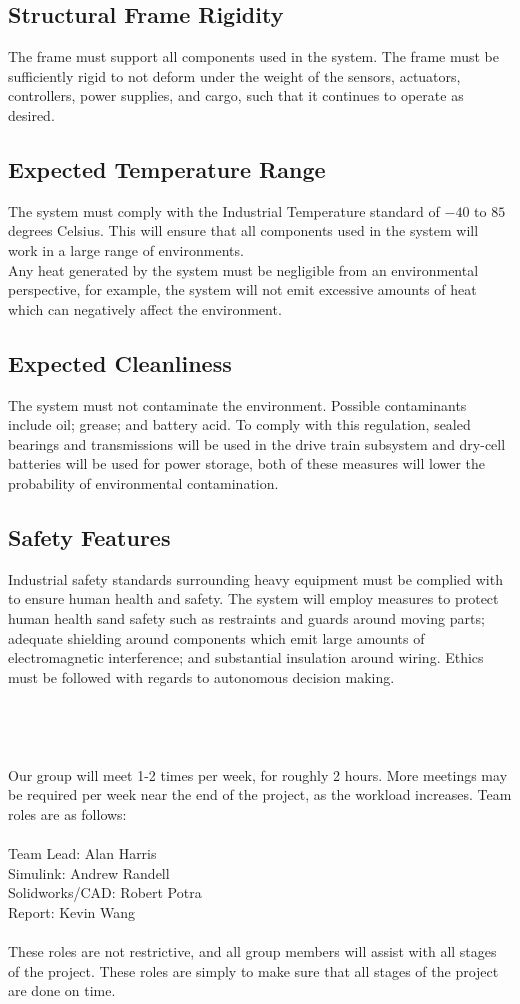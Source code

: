 \documentclass[12pt]{article}
\begin{document}
\subsection{Structural Frame Rigidity}
The frame must support all components used in the system. The frame must be sufficiently rigid to not deform under the weight of the sensors, actuators, controllers, power supplies, and cargo, such that it continues to operate as desired.
\subsection{Expected Temperature Range}
The system must comply with the Industrial Temperature standard of $-40$ to $85$ degrees Celsius. This will ensure that all components used in the system will work in a large range of environments. \\

Any heat generated by the system must be negligible from an environmental perspective, for example, the system will not emit excessive amounts of heat which can negatively affect the environment. 
\subsection{Expected Cleanliness}
The system must not contaminate the environment. Possible contaminants include oil; grease; and battery acid. To comply with this regulation, sealed bearings and transmissions will be used in the drive train subsystem and dry-cell batteries will be used for power storage, both of these measures will lower the probability of environmental contamination.
\subsection{Safety Features}
Industrial safety standards surrounding heavy equipment must be complied with to ensure human health and safety. The system will employ measures to protect human health sand safety such as restraints and guards around moving parts; adequate shielding around components which emit large amounts of electromagnetic interference; and substantial insulation around wiring. Ethics must be followed with regards to autonomous decision making.\\\\\\\\\\
Our group will meet 1-2 times per week, for roughly 2 hours. More meetings may be required per week near the end of the project, as the workload increases. Team roles are as follows:\\\\
Team Lead: Alan Harris\\
Simulink: Andrew Randell\\
Solidworks/CAD: Robert Potra\\
Report: Kevin Wang\\\\
These roles are not restrictive, and all group members will assist with all stages of the project. These roles are simply to make sure that all stages of the project are done on time.
\end{document}

